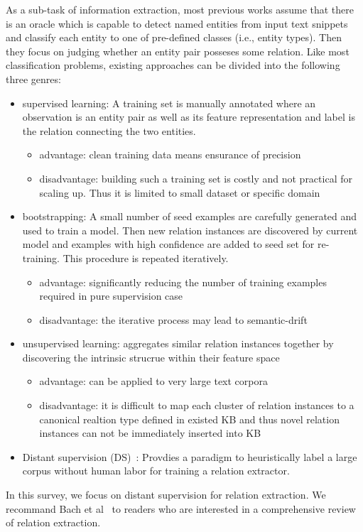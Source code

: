 \documentclass[10pt]{article} %
\theoremstyle{definition}
\theoremstyle{definition}
\begin{document}
As a sub-task of information extraction, most previous works assume that there is an oracle which is capable to detect named entities from input text snippets and classify each entity to one of pre-defined classes (i.e., entity types). 
Then they focus on judging whether an entity pair posseses some relation. 
Like most classification problems, existing approaches can be divided into the following three genres: 
\begin{itemize}
\item supervised learning: A training set is manually annotated where an observation is an entity pair as well as its feature representation and label is the relation connecting the two entities. 
	\begin{itemize}
	\item advantage: clean training data means ensurance of precision 
	\item disadvantage: building such a training set is costly and not practical for scaling up. Thus it is limited to small dataset or specific domain
	\end{itemize}
\item bootstrapping: A small number of seed examples are carefully generated and used to train a model. Then new relation instances are discovered by current model and examples with high confidence are added to seed set for re-training. This procedure is repeated iteratively. 
	\begin{itemize}
	\item advantage: significantly reducing the number of training examples required in pure supervision case 
	\item disadvantage: the iterative process may lead to semantic-drift 
	\end{itemize}
\item unsupervised learning: aggregates similar relation instances together by discovering the intrinsic strucrue within their feature space 
	\begin{itemize}
	\item advantage: can be applied to very large text corpora 
	\item disadvantage: it is difficult to map each cluster of relation instances to a canonical realtion type defined in existed KB and thus novel relation instances can not be immediately inserted into KB
	\end{itemize}
\item Distant supervision (DS)~\cite{mintz}: Provdies a paradigm to heuristically label a large corpus without human labor for training a relation extractor. 
\end{itemize}
In this survey, we focus on distant supervision for relation extraction. 
We recommand Bach et al~\cite{review} to readers who are interested in a comprehensive review of relation extraction. 
\end{document}

